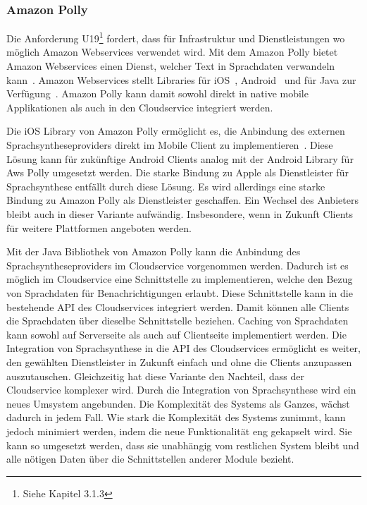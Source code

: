 \subsubsection{Amazon Polly}

Die Anforderung U19\footnote{Siehe Kapitel 3.1.3} fordert, dass für Infrastruktur und Dienstleistungen wo möglich Amazon Webservices verwendet wird.
Mit dem Amazon Polly bietet Amazon Webservices einen Dienst, welcher Text in Sprachdaten verwandeln kann~\cite{aws_polly}.
Amazon Webservices stellt Libraries für iOS~\cite{aws_polly_ios}, Android~\cite{aws_polly_sdks} und für Java zur Verfügung~\cite{aws_polly_java}.
Amazon Polly kann damit sowohl direkt in native mobile Applikationen als auch in den Cloudservice integriert werden.

Die iOS Library von Amazon Polly ermöglicht es, die Anbindung des externen Sprachsyntheseproviders direkt im Mobile Client zu implementieren~\cite{aws_polly_ios}.
Diese Lösung kann für zukünftige Android Clients analog mit der Android Library für Aws Polly umgesetzt werden.
Die starke Bindung zu Apple als Dienstleister für Sprachsynthese entfällt durch diese Lösung.
Es wird allerdings eine starke Bindung zu Amazon Polly als Dienstleister geschaffen.
Ein Wechsel des Anbieters bleibt auch in dieser Variante aufwändig.
Insbesondere, wenn in Zukunft Clients für weitere Plattformen angeboten werden.

Mit der Java Bibliothek von Amazon Polly kann die Anbindung des Sprachsyntheseproviders im Cloudservice vorgenommen werden.
Dadurch ist es möglich im Cloudservice eine Schnittstelle zu implementieren, welche den Bezug von Sprachdaten für Benachrichtigungen erlaubt.
Diese Schnittstelle kann in die bestehende API des Cloudservices integriert werden.
Damit können alle Clients die Sprachdaten über dieselbe Schnittstelle beziehen.
Caching von Sprachdaten kann sowohl auf Serverseite als auch auf Clientseite implementiert werden.
Die Integration von Sprachsynthese in die API des Cloudservices ermöglicht es weiter, den gewählten Dienstleister in Zukunft einfach und ohne die Clients anzupassen auszutauschen.
Gleichzeitig hat diese Variante den Nachteil, dass der Cloudservice komplexer wird.
Durch die Integration von Sprachsynthese wird ein neues Umsystem angebunden.
Die Komplexität des Systems als Ganzes, wächst dadurch in jedem Fall.
Wie stark die Komplexität des Systems zunimmt, kann jedoch minimiert werden, indem die neue Funktionalität eng gekapselt wird.
Sie kann so umgesetzt werden, dass sie unabhängig vom restlichen System bleibt und alle nötigen Daten über die Schnittstellen anderer Module bezieht.

